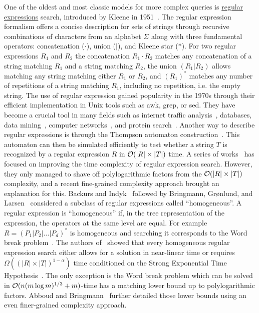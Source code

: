 One of the oldest and most classic models for more complex queries is \ul{regular expressions} search, introduced by Kleene in 1951~\cite{RM-704}.
The regular expression formalism offers a concise description for sets of strings through recursive combinations of characters from an alphabet $\Sigma$ along with three fundamental operators: concatenation ($\cdot$), union ($|$), and Kleene star ($\ast$).
For two regular expressions $R_1$ and $R_2$ the concatenation $R_1\cdot R_2$ matches any concatenation of a string matching $R_1$ and a string matching $R_2$, the union $(R_1|R_2)$ allows matching any string matching either $R_1$ or $R_2$, and $(R_1)^\ast$ matches any number of repetitions of a string matching $R_1$, including no repetition, i.e. the empty string.
The use of regular expression gained popularity in the 1970s through their efficient implementation in Unix tools such as awk, grep, or sed.
They have become a crucial tool in many fields such as internet traffic analysis~\cite{4221791,4579527}, databases, data mining~\cite{1000341,10.5555/645927.672035,10.1145/375551.375569}, computer networks~\cite{10.1145/1159913.1159952}, and protein search~\cite{10.1145/369133.369220}.
Another way to describe regular expressions is through the Thompson automaton construction~\cite{Thompson_automaton}. This automaton can then be simulated efficiently to test whether a string $T$ is recognized by a regular expression $R$ in $\mathcal{O}(|R| \times |T|)$ time.
A series of works~\cite{10.1145/128749.128755,BILLE2008486,10.1007/978-3-642-02927-1_16,10.1007/11786986_56,doi:10.1137/1.9781611973075.104} has focused on improving the time complexity of regular expression search. However, they only managed to shave off polylogarithmic factors from the $\mathcal{O}(|R| \times |T|)$ complexity, and a recent fine-grained complexity approach brought an explanation for this.
Backurs and Indyk~\cite{DBLP:conf/focs/BackursI16} followed by Bringmann, Gr{\o}nlund, and Larsen~\cite{8104068} considered a subclass of regular expressions called ``homogeneous''. A regular expression is ``homogeneous'' if, in the tree representation of the expression, the operators at the same level are equal. For example $R=(P_1|P_2|...|P_d)^\ast$ is homogeneous and searching it corresponds to the Word break problem~\cite{wordbreak1,wordbreak2}. The authors of~\cite{DBLP:conf/focs/BackursI16,8104068} showed that every homogeneous regular expression search either allows for a solution in near-linear time or requires $\Omega((|R| \times |T|)^{1-\alpha})$ time conditioned on the Strong Exponential Time Hypothesis~\cite{IMPAGLIAZZO2001367}. The only exception is the Word break problem which can be solved in $\mathcal{O}(n (m \log m)^{1/3}+m)$-time has a matching lower bound up to polylogarithmic factors. Abboud and Bringmann~\cite{DBLP:conf/icalp/AbboudB18} further detailed those lower bounds using an even finer-grained complexity approach.
